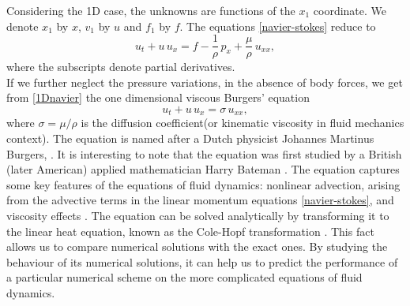 \documentclass[../include.tex]{subfiles}
\begin{document}
Considering the 1D case, the unknowns are functions of the $ x_1 $ coordinate. We denote $ x_1 $ by $ x $, $ v_1$ by $ u $ and $ f_1 $ by $ f $. The equations \eqref{navier-stokes} reduce to
\begin{equation}
	\label{1Dnavier}
	u_t  + u\,u_x =	f - \frac{1}{\rho}\, p_x + \frac{\mu}{\rho}\, u_{xx},
\end{equation}
where the subscripts denote partial derivatives.\\
If we further neglect the pressure variations, in the absence of body forces, we get from \eqref{1Dnavier} the one dimensional viscous Burgers' equation 
\begin{equation}
	u_t + u\,u_x = \sigma\, u_{xx},
	\label{burg}
\end{equation}
where $ \sigma = \mu/\rho $ is the diffusion coefficient(or kinematic viscosity in fluid mechanics context). The equation is named after a Dutch physicist Johannes Martinus Burgers, \cite{burgers}. It is interesting to note that the equation was first studied by a British (later American) applied mathematician Harry Bateman \cite{olv, bateman}.
The equation captures some  key features of the equations of fluid dynamics: nonlinear advection, arising from the advective terms in the linear momentum equations \eqref{navier-stokes}, and viscosity effects \cite{olv, lev}. The equation can be solved analytically by transforming it to the linear heat equation, known as the Cole-Hopf transformation \cite{olv, whitham}. This fact allows us to compare numerical solutions with the exact ones. By studying the behaviour of its numerical solutions, it can help us to predict the performance of a particular numerical scheme on the more complicated equations of fluid dynamics.
\end{document}
